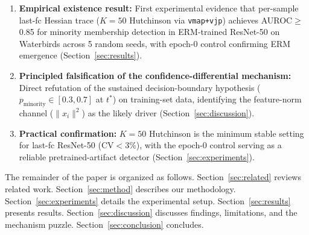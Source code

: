 \begin{enumerate}
\item \textbf{Empirical existence result:} First experimental evidence that per-sample last-fc Hessian trace ($K{=}50$ Hutchinson via \texttt{vmap+vjp}) achieves AUROC$\geq$0.85 for minority membership detection in ERM-trained ResNet-50 on Waterbirds across 5 random seeds, with epoch-0 control confirming ERM emergence (Section~\ref{sec:results}).

\item \textbf{Principled falsification of the confidence-differential mechanism:} Direct refutation of the sustained decision-boundary hypothesis ($p_{\text{minority}}\in[0.3,0.7]$ at $t^*$) on training-set data, identifying the feature-norm channel ($\|x_i\|^2$) as the likely driver (Section~\ref{sec:discussion}).

\item \textbf{Practical confirmation:} $K{=}50$ Hutchinson is the minimum stable setting for last-fc ResNet-50 (CV$<$3\%), with the epoch-0 control serving as a reliable pretrained-artifact detector (Section~\ref{sec:experiments}).
\end{enumerate}

The remainder of the paper is organized as follows. Section~\ref{sec:related} reviews related work. Section~\ref{sec:method} describes our methodology. Section~\ref{sec:experiments} details the experimental setup. Section~\ref{sec:results} presents results. Section~\ref{sec:discussion} discusses findings, limitations, and the mechanism puzzle. Section~\ref{sec:conclusion} concludes.
